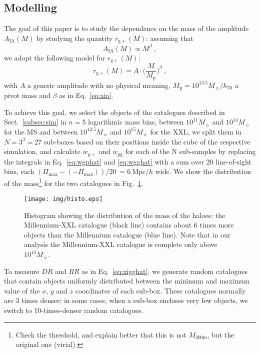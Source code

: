 \documentclass[a4paper,fleqn,usenatbib]{mnras}
\begin{document}
\subsection{Modelling}
\label{subsec:modelling}
The goal of this paper is to study the dependence on the mass of the amplitude $A_{\mathrm{IA}} (M)$ by studying the quantity $r_{\mathrm{g+}} (M)$: assuming that
\begin{equation}
A_{\mathrm{IA}} (M)\propto M^{\beta} \ , 
	\label{eq:aia}
\end{equation}
we adopt the following model for $r_{\mathrm{g+}} (M)$:
\begin{equation}
    r_{\mathrm{g+}} (M) = A \cdot  \biggl ( \frac{M}{M_{\mathrm{p}}} \biggl )^{\beta} \ ,
	\label{eq:modelrg+}
\end{equation}
with $A$ a generic amplitude with no physical meaning, $M_{\mathrm{p}} = 10^{13.5} M_{\sun}/h_{70}$ a pivot mass and $\beta$ as in Eq.~\ref{eq:aia}.

To achieve this goal, we select the objects of the catalogues described in Sect.~\ref{subsec:sim} in $n = 5$ logarithmic mass bins, between $10^{11} M_{\sun}$ and $10^{14} M_{\sun}$ for the MS and between $10^{12.5} M_{\sun}$ and $10^{15} M_{\sun}$ for the XXL, we split them in $N = 3^3 = 27$ sub-boxes based on their positions inside the cube of the respective simulation, and calculate $w_{\mathrm{g+}}$ and $w_{\mathrm{gg}
}$ for each of the N sub-samples by replacing the integrals in Eq.~\ref{eq:wgphat} and \ref{eq:wgghat} with a sum over 20 line-of-sight bins, each $(\Pi_{\mathrm{max}} - (-\Pi_{\mathrm{max}}))/ 20 \ = 6 \ \mbox{Mpc}/h$ wide. We show the distribution of the mass\footnote{Check the threshold, and explain better that this is not $M_{\mathrm{200m}}$, but the original one (virial).} for the two catalogues in Fig.~\ref{fig:histo}. 
\begin{figure}
	\centerline{
	\texttt{[image: img/histo.eps]}}
	\caption{Histogram showing the distribution of the mass of the haloes: the Millennium-XXL catalogue (black line) contains about 6 times more objects than the Millennium catalogue (blue line). Note that in our analysis the Millennium-XXL catalogue is complete only above $10^{13} M_{\sun}$.}
	\label{fig:histo}
\end{figure}

To measure $DR$ and $RR$ as in Eq.~\ref{eq:xigghat}, we generate random catalogues that contain objects uniformly distributed between the minimum and maximum value of the $x$, $y$ and $z$ coordinates of each sub-box. These catalogues normally are 3 times denser; in some cases, when a sub-box encloses very few objects, we switch to 10-times-denser random catalogues.
\end{document}
